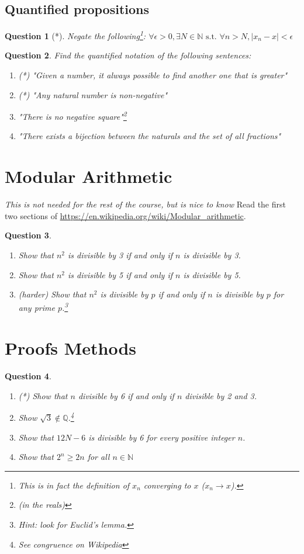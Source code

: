 \documentclass[]{article}
\newtheorem{question}{Question}
\newcommand{\N}{\mathbb{N}}
\newcommand{\Q}{\mathbb{Q}}
\newcommand{\abs}[1]{| #1 |}
\begin{document}
\subsection{Quantified propositions}
\begin{question}[*]
	Negate the following\footnote{This is in fact the definition of $x_n$ converging to $x$ ($x_n \to x$).}:
	$\forall \epsilon>0, \exists N \in \N \text{ s.t. } \forall n>N, \abs{x_n-x}<\epsilon$
\end{question}
\begin{question}
	Find the quantified notation of the following sentences:
	\begin{enumerate}[label=\alph*.]
		\item (*) "Given a number, it always possible to find another one that is greater"
		\item (*) "Any natural number is non-negative"
		\item "There is no negative square"\footnote{(in the reals)}
		\item "There exists a bijection between the naturals and the set of all fractions"
	\end{enumerate}
\end{question}

\section{Modular Arithmetic}
\textit{This is not needed for the rest of the course, but is nice to know}
Read the first two sections of \url{https://en.wikipedia.org/wiki/Modular_arithmetic}.
\begin{question}
	\begin{enumerate}[label=\alph*.]
		\item Show that $n^2$ is divisible by 3 if and only if $n$ is divisible by 3.
		\item Show that $n^2$ is divisible by 5 if and only if $n$ is divisible by 5.
		\item (harder) Show that $n^2$ is divisible by $p$ if and only if $n$ is divisible by $p$ for any prime $p$.\footnote{Hint: look for Euclid's lemma.}
	\end{enumerate}
\end{question}


\section{Proofs Methods}
\begin{question}
	\begin{enumerate}[label=\alph*.]
		\item (*) Show that $n$ divisible by 6 if and only if $n$ divisible by 2 and 3.
		\item Show $\sqrt{3} \not\in \Q$.\footnote{See congruence on Wikipedia}
		\item Show that $12N-6$ is divisible by 6 for every positive integer $n$.
		\item Show that $2^n \geq 2n$ for all $n \in \N$
	\end{enumerate}
\end{question}
\end{document}
